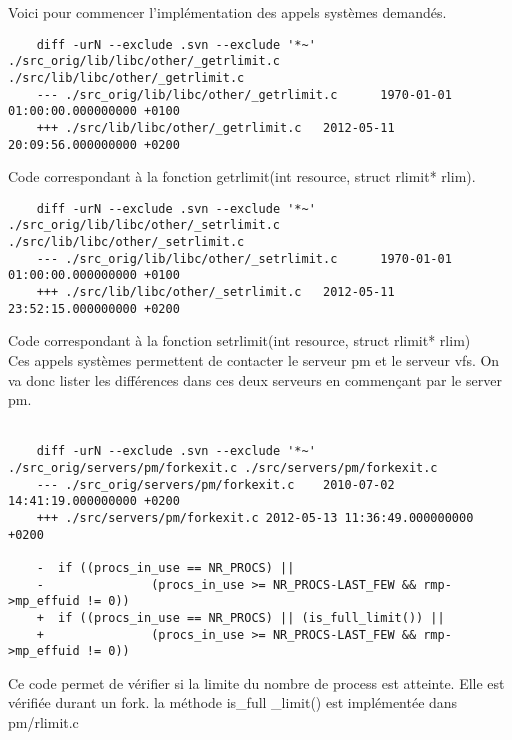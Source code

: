\documentclass[9pt , a4paper]{report}
\begin{document}
	Voici pour commencer l'implémentation des appels systèmes demandés.\\
	\begin{lstlisting}														 
	diff -urN --exclude .svn --exclude '*~' ./src_orig/lib/libc/other/_getrlimit.c ./src/lib/libc/other/_getrlimit.c
	--- ./src_orig/lib/libc/other/_getrlimit.c      1970-01-01 01:00:00.000000000 +0100
	+++ ./src/lib/libc/other/_getrlimit.c   2012-05-11 20:09:56.000000000 +0200
	\end{lstlisting}
	Code correspondant à la fonction getrlimit(int resource, struct rlimit* rlim). \\ 
	\begin{lstlisting}
	diff -urN --exclude .svn --exclude '*~' ./src_orig/lib/libc/other/_setrlimit.c ./src/lib/libc/other/_setrlimit.c
	--- ./src_orig/lib/libc/other/_setrlimit.c      1970-01-01 01:00:00.000000000 +0100
	+++ ./src/lib/libc/other/_setrlimit.c   2012-05-11 23:52:15.000000000 +0200
	\end{lstlisting}
	Code correspondant à la fonction setrlimit(int resource, struct rlimit* rlim) \\
	Ces appels systèmes permettent de contacter le serveur pm et le serveur vfs. On va donc lister les différences dans ces 	deux serveurs en commençant par le server pm. 
	\\ \\
	\begin{lstlisting}
	diff -urN --exclude .svn --exclude '*~' ./src_orig/servers/pm/forkexit.c ./src/servers/pm/forkexit.c
	--- ./src_orig/servers/pm/forkexit.c    2010-07-02 14:41:19.000000000 +0200
	+++ ./src/servers/pm/forkexit.c 2012-05-13 11:36:49.000000000 +0200

	-  if ((procs_in_use == NR_PROCS) || 
	-               (procs_in_use >= NR_PROCS-LAST_FEW && rmp->mp_effuid != 0))
	+  if ((procs_in_use == NR_PROCS) || (is_full_limit()) || 
	+               (procs_in_use >= NR_PROCS-LAST_FEW && rmp->mp_effuid != 0))
    	 \end{lstlisting}

	Ce code permet de vérifier si la limite du nombre de process est atteinte. Elle est vérifiée durant un fork. la méthode is\_full	\_limit() est implémentée dans pm/rlimit.c
	
\end{document}
